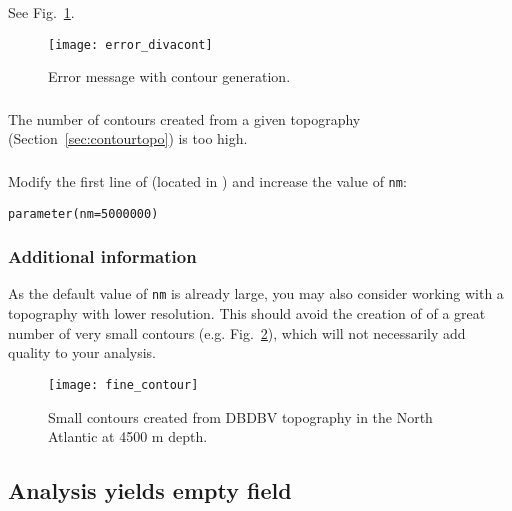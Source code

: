 See Fig.~\ref{error:cont}.

\begin{figure}[htpb]
\centering
\texttt{[image: error\_divacont]}
\caption{Error message with contour generation.\label{error:cont}}
\end{figure}

\subsubsection{\question}

The number of contours created from a given topography (Section~\ref{sec:contourtopo}) is too high. 

\subsubsection{\answer}

Modify the first line of  (located in ) and increase the value of \texttt{nm}:
\begin{verbatim}
parameter(nm=5000000)
\end{verbatim}

\subsubsection{Additional information}

As the default value of \texttt{nm} is already large, you may also consider working with a topography with lower resolution. This should avoid the creation of of a great number of very small contours (e.g. Fig.~\ref{fig:smallcont}), which will not necessarily add quality to your analysis.


\begin{figure}[htpb]
\centering
\parbox{.65\textwidth}{
\texttt{[image: fine\_contour]}
}\parbox{.35\textwidth}{
\caption[Small contours]{Small contours created from DBDBV topography in the North Atlantic at 4500 m depth\label{fig:smallcont}.}
}
\end{figure}
 


%





\subsection{Analysis yields empty field}


